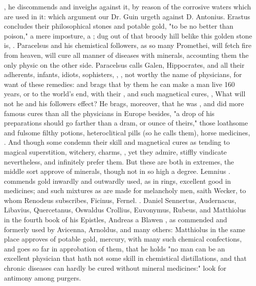 {, he discommends and inveighs against it, by reason of the corrosive waters which are used in it: which argument our Dr. Guin urgeth against D. Antonius. Erastus concludes their philosophical stones and potable gold, \etc{} "to be no better than poison," a mere imposture, a ; dug out of that broody hill belike this golden stone is, . Paracelsus and his chemistical followers, as so many Promethei, will fetch fire from heaven, will cure all manner of diseases with minerals, accounting them the only physic on the other side. Paracelsus calls Galen, Hippocrates, and all their adherents, infants, idiots, sophisters, \etc{} , \etc{}, not worthy the name of physicians, for want of these remedies: and brags that by them he can make a man live 160 years, or to the world's end, with their , and such magnetical cures, , \etc{} What will not he and his followers effect? He brags, moreover, that he was , and did more famous cures than all the physicians in Europe besides, "a drop of his preparations should go farther than a dram, or ounce of theirs," those loathsome and fulsome filthy potions, heteroclitical pills (so he calls them), horse medicines, . And though some condemn their skill and magnetical cures as tending to magical superstition, witchery, charms, \etc{}, yet they admire, stiffly vindicate nevertheless, and infinitely prefer them. But these are both in extremes, the middle sort approve of minerals, though not in so high a degree. Lemnius . commends gold inwardly and outwardly used, as in rings, excellent good in medicines; and such mixtures as are made for melancholy men, saith Wecker,  to whom Renodeus subscribes,  Ficinus,  Fernel. . Daniel Sennertus,  Audernacus, Libavius, Quercetanus, Oswaldus Crollius, Euvonymus, Rubeus, and Matthiolus in the fourth book of his Epistles, Andreas a Blawen , as commended and formerly used by Avicenna, Arnoldus, and many others: Matthiolus in the same place approves of potable gold, mercury, with many such chemical confections, and goes so far in approbation of them, that he holds "no man can be an excellent physician that hath not some skill in chemistical distillations, and that chronic diseases can hardly be cured without mineral medicines:" look for antimony among purgers.

}
